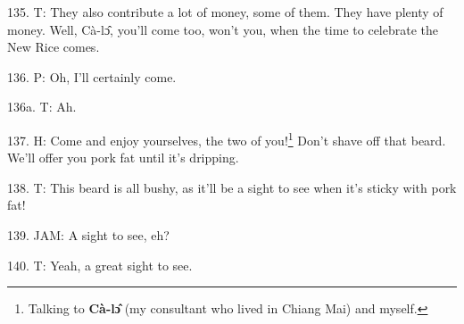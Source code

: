 135. T: They also contribute a lot of money, some of them. They have plenty of
money. Well, Cà-lɔ̂, you'll come too, won't you, when the time to celebrate
the New Rice comes.

136. P: Oh, I'll certainly come.

136a. T: Ah.

137. H: Come and enjoy yourselves, the two of you!\footnote{Talking to \textbf{Cà-lɔ̂} (my consultant who lived in Chiang Mai) and myself.} Don't shave off that beard.
We'll offer you pork fat until it's dripping.

138. T: This beard is all bushy, as it'll be a sight to see when it's sticky with
pork fat!

139. JAM: A sight to see, eh?

140. T: Yeah, a great sight to see.

